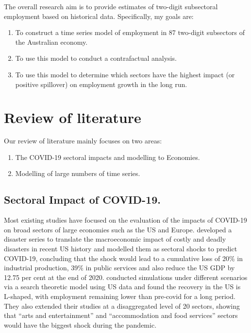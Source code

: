 \documentclass[11pt,a4paper,]{article}
\begin{document}
The overall research aim is to provide estimates of two-digit subsectoral employment based on historical data. Specifically, my goals are:

\begin{enumerate}
\def\labelenumi{\arabic{enumi}.}
\item
  To construct a time series model of employment in 87 two-digit subsectors of the Australian economy.
\item
  To use this model to conduct a contrafactual analysis.
\item
  To use this model to determine which sectors have the highest impact (or positive spillover) on employment growth in the long run.
\end{enumerate}

\newpage

\hypertarget{review-of-literature}{%
\section{Review of literature}\label{review-of-literature}}

Our review of literature mainly focuses on two areas:

\begin{enumerate}
\def\labelenumi{\arabic{enumi}.}
\item
  The COVID-19 sectoral impacts and modelling to Economies.
\item
  Modelling of large numbers of time series.
\end{enumerate}

\hypertarget{sectoral-impact-of-covid-19.}{%
\subsection{Sectoral Impact of COVID-19.}\label{sectoral-impact-of-covid-19.}}

Most existing studies have focused on the evaluation of the impacts of COVID-19 on broad sectors of large economies such as the US and Europe. \textcite{ludvigson2020covid} developed a disaster series to translate the macroeconomic impact of costly and deadly disasters in recent US history and modelled them as sectoral shocks to predict COVID-19, concluding that the shock would lead to a cumulative loss of 20\% in industrial production, 39\% in public services and also reduce the US GDP by 12.75 per cent at the end of 2020. \textcite{gregory2020pandemic} conducted simulations under different scenarios via a search theoretic model using US data and found the recovery in the US is L-shaped, with employment remaining lower than pre-covid for a long period. They also extended their studies at a disaggregated level of 20 sectors, showing that ``arts and entertainment'' and ``accommodation and food services'' sectors would have the biggest shock during the pandemic.
\end{document}
